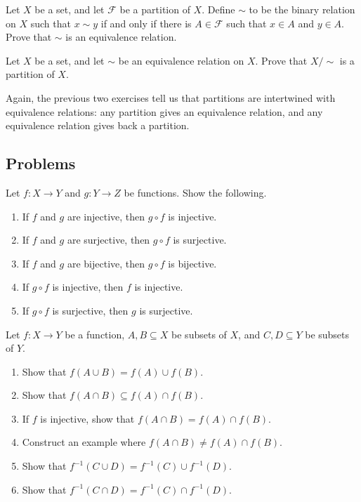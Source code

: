 \documentclass[../main.tex]{subfiles}
\begin{document}
\begin{exercise}
    Let $X$ be a set, and let $\mathcal{F}$ be a partition of $X$. Define $\sim$ to be the binary relation on $X$ such that $x \sim y$ if and only if there is $A \in \mathcal{F}$ such that $x \in A$ and $y \in A$. Prove that $\sim$ is an equivalence relation.
\end{exercise}
\begin{exercise}
    Let $X$ be a set, and let $\sim$ be an equivalence relation on $X$. Prove that $X /{\sim}$ is a partition of $X$.
\end{exercise}
Again, the previous two exercises tell us that partitions are intertwined with equivalence relations: any partition gives an equivalence relation, and any equivalence relation gives back a partition.

\subsection{Problems}
\begin{homework} \label{prob:compose-injs-surjs}
    Let $f\colon X \to Y$ and $g\colon Y \to Z$ be functions. Show the following.
    \begin{enumerate}[label=(\alph*)]
        \item If $f$ and $g$ are injective, then $g \circ f$ is injective.
        \item If $f$ and $g$ are surjective, then $g \circ f$ is surjective.
        \item If $f$ and $g$ are bijective, then $g \circ f$ is bijective.
        \item If $g\circ f$ is injective, then $f$ is injective.
        \item If $g\circ f$ is surjective, then $g$ is surjective.
    \end{enumerate}
\end{homework}
\begin{homework}
    Let $f\colon X\to Y$ be a function, $A,B\subseteq X$ be subsets of $X$, and $C,D\subseteq Y$ be subsets of $Y$.
    \begin{enumerate}[label=(\alph*)]
        \item Show that $f(A\cup B)=f(A)\cup f(B)$.
        \item Show that $f(A\cap B)\subseteq f(A)\cap f(B)$.
        \item If $f$ is injective, show that $f(A\cap B)=f(A)\cap f(B)$.
        \item Construct an example where $f(A\cap B)\ne f(A)\cap f(B)$.
        \item Show that $f^{-1}(C\cup D)=f^{-1}(C)\cup f^{-1}(D)$.
        \item Show that $f^{-1}(C\cap D)=f^{-1}(C)\cap f^{-1}(D)$.
    \end{enumerate}
\end{homework}
\end{document}
